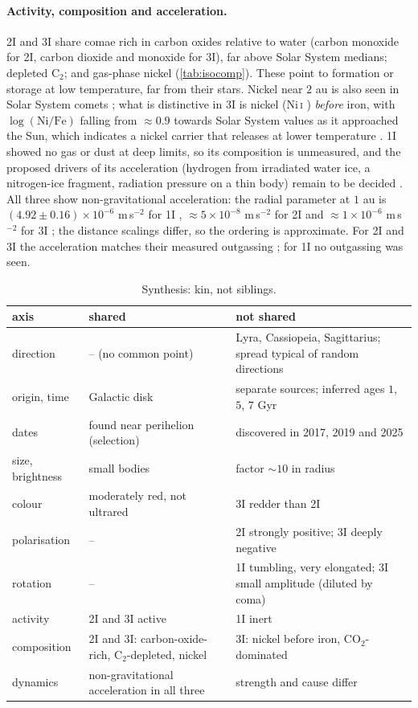 \documentclass[11pt]{article}
\theoremstyle{definition}\newtheorem{definition}[theorem]{Definition}
\theoremstyle{remark}\newtheorem{remark}[theorem]{Remark}
\begin{document}
\paragraph{Activity, composition and acceleration.} 2I and 3I share comae rich in carbon oxides relative to water (carbon monoxide for 2I, carbon dioxide and monoxide for 3I), far above Solar System medians; depleted C$_2$; and gas-phase nickel (\cref{tab:isocomp}). These point to formation or storage at low temperature, far from their stars. Nickel near $2$ au is also seen in Solar System comets \cite{Manfroid21}; what is distinctive in 3I is nickel (Ni\,\textsc{i} \cite{Rahat25}) \emph{before} iron, with $\log(\mathrm{Ni/Fe})$ falling from $\approx0.9$ towards Solar System values as it approached the Sun, which indicates a nickel carrier that releases at lower temperature \cite{Hutsemekers26}. 1I showed no gas or dust at deep limits, so its composition is unmeasured, and the proposed drivers of its acceleration (hydrogen from irradiated water ice, a nitrogen-ice fragment, radiation pressure on a thin body) remain to be decided \cite{BS23,JD21}. All three show non-gravitational acceleration: the radial parameter at $1$ au is $(4.92\pm0.16)\times10^{-6}$ m\,s$^{-2}$ for 1I \cite{Micheli18}, $\approx5\times10^{-8}$ m\,s$^{-2}$ for 2I \cite{Hui20} and $\approx1\times10^{-6}$ m\,s$^{-2}$ for 3I \cite{Spada26}; the distance scalings differ, so the ordering is approximate. For 2I and 3I the acceleration matches their measured outgassing \cite{Hui20,Thoss26}; for 1I no outgassing was seen.

\begin{table}[!htb]\centering\small
\begin{tabular}{@{}>{\raggedright\arraybackslash}p{2.6cm}>{\raggedright\arraybackslash}p{5.4cm}>{\raggedright\arraybackslash}p{6.0cm}@{}}\toprule
axis & shared & not shared\\\midrule
direction & -- (no common point) & Lyra, Cassiopeia, Sagittarius; spread typical of random directions\\
origin, time & Galactic disk & separate sources; inferred ages $1$, $5$, $7$ Gyr\\
dates & found near perihelion (selection) & discovered in 2017, 2019 and 2025\\
size, brightness & small bodies & factor $\sim10$ in radius\\
colour & moderately red, not ultrared & 3I redder than 2I\\
polarisation & -- & 2I strongly positive; 3I deeply negative\\
rotation & -- & 1I tumbling, very elongated; 3I small amplitude (diluted by coma)\\
activity & 2I and 3I active & 1I inert\\
composition & 2I and 3I: carbon-oxide-rich, C$_2$-depleted, nickel & 3I: nickel before iron, CO$_2$-dominated\\
dynamics & non-gravitational acceleration in all three & strength and cause differ\\\bottomrule
\end{tabular}
\caption{Synthesis: kin, not siblings.}\label{tab:isosyn}
\end{table}
\end{document}
